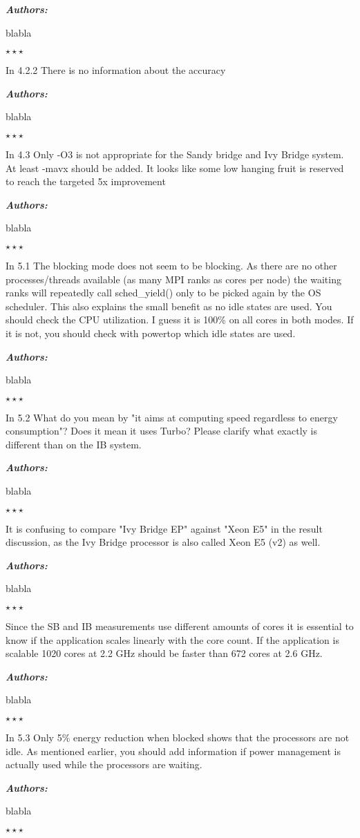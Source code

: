 \documentclass[a4paper,11pt]{article}
\newcounter{question}
\newcommand{\weReply}{\vspace{0.25cm} {\bf \noindent } \addtocounter{question}{1} \textbf{\emph{Authors:}} \medskip \em\par}
\newenvironment{weSay}{\bigskip \weReply \begin{it}}{\end{it}\begin{center} \samepage$\star \star \star$ \end{center}}
\begin{document}
\begin{weSay}
blabla
\end{weSay}

In 4.2.2
There is no information about the accuracy

\begin{weSay}
blabla
\end{weSay}

In 4.3
Only -O3 is not appropriate for the Sandy bridge and Ivy Bridge system. At
least -mavx should be added. It looks like some low hanging fruit is reserved
to reach the targeted 5x improvement

\begin{weSay}
blabla
\end{weSay}

In 5.1
The blocking mode does not seem to be blocking. As there are no other
processes/threads available (as many MPI ranks as cores per node) the waiting
ranks will repeatedly call sched\_yield() only to be picked again by the OS
scheduler. This also explains the small benefit as no idle states are used.
You should check the CPU utilization. I guess it is 100\% on all cores in both
modes. If it is not, you should check with powertop which idle states are used.

\begin{weSay}
blabla
\end{weSay}

In 5.2
What do you mean by "it aims at computing speed regardless to energy consumption"?
Does it mean it uses Turbo? Please clarify what exactly is different than on the
IB system.

\begin{weSay}
blabla
\end{weSay}

It is confusing to compare "Ivy Bridge EP" against "Xeon E5" in the result
discussion, as the Ivy Bridge processor is also called Xeon E5 (v2) as well.

\begin{weSay}
blabla
\end{weSay}

Since the SB and IB measurements use different amounts of cores it is essential to
know if the application scales linearly with the core count. If the application
is scalable 1020 cores at 2.2 GHz should be faster than 672 cores at 2.6 GHz.

\begin{weSay}
blabla
\end{weSay}

In 5.3
Only 5\% energy reduction when blocked shows that the processors are not idle.
As mentioned earlier, you should add information if power management is
actually used while the processors are waiting.

\begin{weSay}
blabla
\end{weSay}
\end{document}
